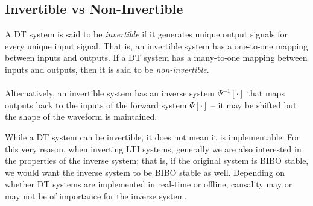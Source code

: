 \documentclass{report}
\begin{document}
\subsection{Invertible vs Non-Invertible}
A DT system is said to be \emph{invertible} if it generates unique output signals for every unique input signal. That is, an invertible system has a one-to-one mapping between 
inputs and outputs. If a DT system has a many-to-one mapping between inputs and outputs, then it is said to be \emph{non-invertible}. 
\\ \\
Alternatively, an invertible system has an inverse system $\Psi^{-1}[\cdot]$ that maps outputs back to the inputs of the forward system $\Psi[\cdot]$ -- it may be shifted but the shape of the waveform is maintained. 
\begin{center}
\end{center}
\begin{center}
\end{center}
While a DT system can be invertible, it does not mean it is implementable. For this very reason, when inverting LTI systems, generally we are also interested in the properties of the 
inverse system; that is, if the original system is BIBO stable, we would want the inverse system to be BIBO stable as well. Depending on whether DT systems are implemented in real-time 
or offline, causality may or may not be of importance for the inverse system. 
\end{document}
